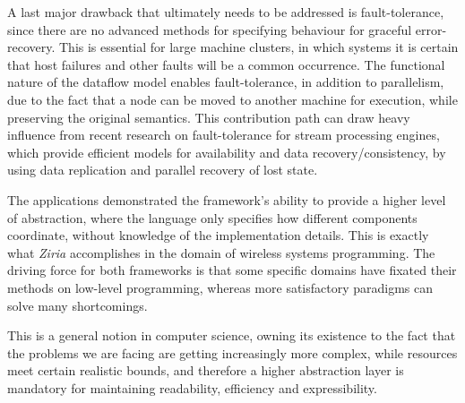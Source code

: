 \documentclass[sigplan,review,anonymous]{acmart}
\begin{document}
A last major drawback that ultimately needs to be addressed is fault-tolerance,
since there are no advanced methods for specifying behaviour for graceful
error-recovery. This is essential for large machine clusters, in which systems it is
certain that host failures and other faults will be a common occurrence. The
functional nature of the dataflow model enables fault-tolerance, in addition to
parallelism, due to the fact that a node can be moved to another machine for
execution, while preserving the original semantics.  This contribution path can draw
heavy influence from recent research on fault-tolerance for stream processing engines\cite{borealis,wide_area},
which provide efficient models for availability and data recovery/consistency,
by using data replication and parallel recovery of lost state.

The applications demonstrated the framework's ability to provide a higher level
of abstraction, where the language only specifies how different components
coordinate, without knowledge of the implementation details. This is exactly
what \textit{Ziria} accomplishes in the domain of wireless systems
programming\cite{ziria}. The driving force for both frameworks is that some
specific domains have fixated their methods on low-level programming, whereas
more satisfactory paradigms can solve many shortcomings.

This is a general notion in computer science, owning its existence to the fact
that the problems we are facing are getting increasingly more complex, while
resources meet certain realistic bounds, and therefore a higher abstraction
layer is mandatory for maintaining readability, efficiency and expressibility.



\end{document}
